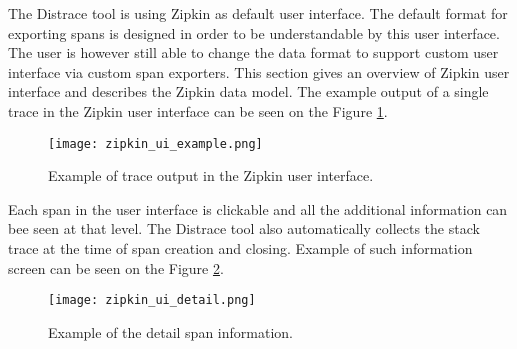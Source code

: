 The Distrace tool is using Zipkin as default user interface. The default format for exporting spans is designed in order to be understandable by this user interface. The user is however still able to change the data format to support custom user interface via custom span exporters. This section gives an overview of Zipkin user interface and describes the Zipkin data model. The example output of a single trace in the Zipkin user interface can be seen on the Figure \ref{fig:zipkin_ui}.

\begin{figure}
	\centering
	\texttt{[image: zipkin\_ui\_example.png]}
	\caption{Example of trace output in the Zipkin user interface.}
	\label{fig:zipkin_ui}
\end{figure}

Each span in the user interface is clickable and all the additional information can bee seen at that level. The Distrace tool also automatically collects the stack trace at the time of span creation and closing. Example of such information screen can be seen on the Figure \ref{fig:zipkin_ui_detail}.
\begin{figure}
	\centering
	\texttt{[image: zipkin\_ui\_detail.png]}
	\caption{Example of the detail span information.}
	\label{fig:zipkin_ui_detail}
\end{figure}
